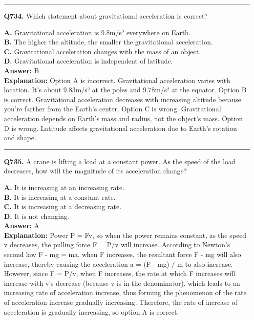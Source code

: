 \documentclass[12pt]{article}
\begin{document}
\hrule
\vspace{1em}


\noindent
\textbf{Q734.} Which statement about gravitational acceleration is correct?



\textbf{A.} Gravitational acceleration is 9.8m/s² everywhere on Earth. \\
\textbf{B.} The higher the altitude, the smaller the gravitational acceleration. \\
\textbf{C.} Gravitational acceleration changes with the mass of an object. \\
\textbf{D.} Gravitational acceleration is independent of latitude. \\

\textbf{Answer:} B \\
\textbf{Explanation:} Option A is incorrect. Gravitational acceleration varies with location. It's about 9.83m/s² at the poles and 9.78m/s² at the equator.
Option B is correct. Gravitational acceleration decreases with increasing altitude because you're farther from the Earth's center.
Option C is wrong. Gravitational acceleration depends on Earth's mass and radius, not the object's mass.
Option D is wrong. Latitude affects gravitational acceleration due to Earth's rotation and shape.

\hrule
\vspace{1em}


\noindent
\textbf{Q735.} A crane is lifting a load at a constant power. As the speed of the load decreases, how will the magnitude of its acceleration change?



\textbf{A.} It is increasing at an increasing rate. \\
\textbf{B.} It is increasing at a constant rate. \\
\textbf{C.} It is increasing at a decreasing rate. \\
\textbf{D.} It is not changing. \\

\textbf{Answer:} A \\
\textbf{Explanation:} Power P = Fv, so when the power remains constant, as the speed v decreases, the pulling force F = P/v will increase. According to Newton's second law F - mg = ma, when F increases, the resultant force F - mg will also increase, thereby causing the acceleration a = (F - mg) / m to also increase. However, since F = P/v, when F increases, the rate at which F increases will increase with v's decrease (because v is in the denominator), which leads to an increasing rate of acceleration increase, thus forming the phenomenon of the rate of acceleration increase gradually increasing. Therefore, the rate of increase of acceleration is gradually increasing, so option A is correct.
\end{document}
